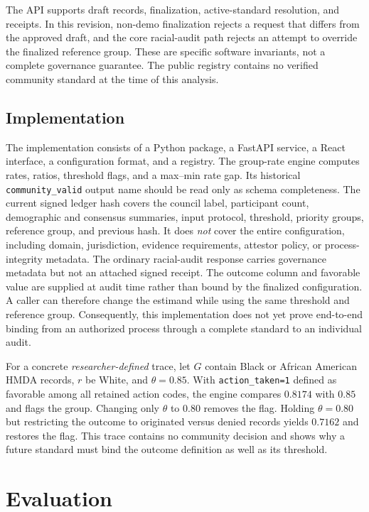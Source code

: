 \documentclass[10pt]{article}
\newcommand{\code}[1]{\texttt{#1}}
\begin{document}
The API supports draft records, finalization, active-standard resolution, and
receipts. In this revision, non-demo finalization rejects a request that
differs from the approved draft, and the core racial-audit path rejects an
attempt to override the finalized reference group. These are specific
software invariants, not a complete governance guarantee. The public registry
contains no verified community standard at the time of this analysis.

\subsection{Implementation}

The implementation consists of a Python package, a FastAPI service, a React
interface, a configuration format, and a registry. The group-rate engine
computes rates, ratios, threshold flags, and a max--min rate gap. Its historical
\code{community\_valid} output name should be read only as schema completeness.
The current signed ledger hash covers the council label, participant count,
demographic and consensus summaries, input protocol, threshold, priority
groups, reference group, and previous hash. It does \emph{not} cover the entire
configuration, including domain, jurisdiction, evidence requirements,
attestor policy, or process-integrity metadata. The ordinary racial-audit
response carries governance metadata but not an attached signed receipt.
The outcome column and favorable value are supplied at audit time rather than
bound by the finalized configuration. A caller can therefore change the
estimand while using the same threshold and reference group.
Consequently, this implementation does not yet prove end-to-end binding from
an authorized process through a complete standard to an individual audit.

For a concrete \emph{researcher-defined} trace, let $G$ contain Black or
African American HMDA records, $r$ be White, and $\theta=0.85$. With
\code{action\_taken=1} defined as favorable among all retained action codes,
the engine compares $0.8174$ with $0.85$ and flags the group. Changing only
$\theta$ to $0.80$ removes the flag. Holding $\theta=0.80$ but restricting the
outcome to originated versus denied records yields $0.7162$ and restores the
flag. This trace contains no community decision and shows why a future standard
must bind the outcome definition as well as its threshold.

\section{Evaluation}
\end{document}

